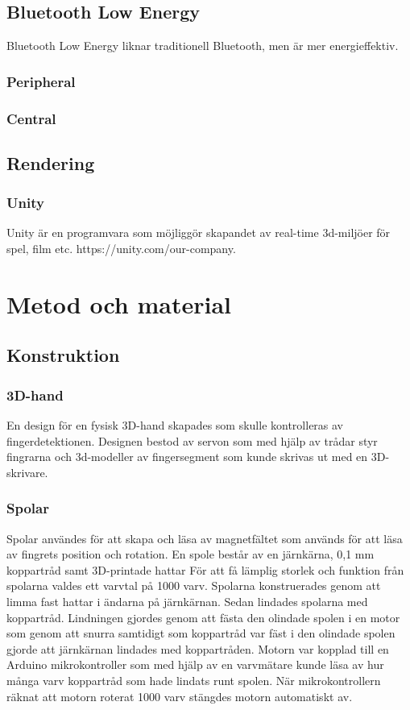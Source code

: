 \documentclass[a4paper]{article}
\begin{document}
\begin{sloppypar}
    \subsection{Bluetooth Low Energy}
    Bluetooth Low Energy liknar traditionell Bluetooth, men är mer energieffektiv.
    \subsubsection{Peripheral}
    \subsubsection{Central}

    \subsection{Rendering}
    \subsubsection{Unity}
    Unity är en programvara som möjliggör skapandet av real-time 3d-miljöer för spel, film etc. https://unity.com/our-company.

    \section{Metod och material}



    \subsection{Konstruktion}

    \subsubsection{3D-hand}
    En design för en fysisk 3D-hand skapades som skulle kontrolleras av fingerdetektionen.
    Designen bestod av servon som med hjälp av trådar styr fingrarna
    och 3d-modeller av fingersegment som kunde skrivas ut med en 3D-skrivare.

    \subsubsection{Spolar}
    Spolar användes för att skapa och läsa av magnetfältet som används för att läsa av fingrets position och rotation.
    En spole består av en järnkärna, 0,1 mm koppartråd samt 3D-printade hattar
    För att få lämplig storlek och funktion från spolarna valdes ett varvtal på 1000 varv.
    Spolarna konstruerades genom att limma fast hattar i ändarna på järnkärnan.
    Sedan lindades spolarna med koppartråd.
    Lindningen gjordes genom att fästa den olindade spolen i en motor som genom att snurra samtidigt som koppartråd
    var fäst i den olindade spolen gjorde att järnkärnan lindades med koppartråden.
    Motorn var kopplad till en Arduino mikrokontroller som med hjälp av en varvmätare kunde läsa av hur många varv
    koppartråd som hade lindats runt spolen.
    När mikrokontrollern räknat att motorn roterat 1000 varv stängdes motorn automatiskt av.




\end{sloppypar}
\end{document}
